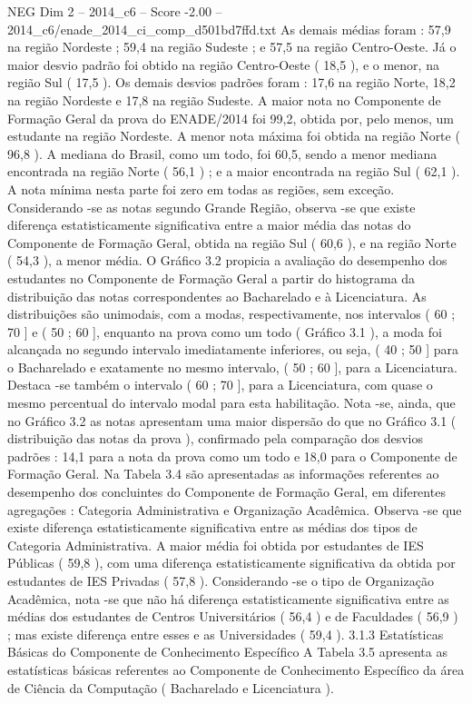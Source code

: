 \begin{textsample}{NEG Dim 2 – 2014\_c6 – Score -2.00 – 2014\_c6/enade\_2014\_ci\_comp\_d501bd7ffd.txt}
As demais médias foram : 57,9 na região Nordeste ; 59,4 na região Sudeste ; e 57,5 na região Centro-Oeste.
Já o maior desvio padrão foi obtido na região Centro-Oeste ( 18,5 ), e o menor, na região Sul ( 17,5 ).
Os demais desvios padrões foram : 17,6 na região Norte, 18,2 na região Nordeste e 17,8 na região Sudeste.
A maior nota no Componente de Formação Geral da prova do ENADE/2014 foi 99,2, obtida por, pelo menos, um estudante na região Nordeste.
A menor nota máxima foi obtida na região Norte ( 96,8 ).
A mediana do Brasil, como um todo, foi 60,5, sendo a menor mediana encontrada na região Norte ( 56,1 ) ; e a maior encontrada na região Sul ( 62,1 ).
A nota mínima nesta parte foi zero em todas as regiões, sem exceção.
Considerando -se as notas segundo Grande Região, observa -se que existe diferença estatisticamente significativa entre a maior média das notas do Componente de Formação Geral, obtida na região Sul ( 60,6 ), e na região Norte ( 54,3 ), a menor média.
O Gráfico 3.2 propicia a avaliação do desempenho dos estudantes no Componente de Formação Geral a partir do histograma da distribuição das notas correspondentes ao Bacharelado e à Licenciatura.
As distribuições são unimodais, com a modas, respectivamente, nos intervalos ( 60 ; 70 ] e ( 50 ; 60 ], enquanto na prova como um todo ( Gráfico 3.1 ), a moda foi alcançada no segundo intervalo imediatamente inferiores, ou seja, ( 40 ; 50 ] para o Bacharelado e exatamente no mesmo intervalo, ( 50 ; 60 ], para a Licenciatura.
Destaca -se também o intervalo ( 60 ; 70 ], para a Licenciatura, com quase o mesmo percentual do intervalo modal para esta habilitação.
Nota -se, ainda, que no Gráfico 3.2 as notas apresentam uma maior dispersão do que no Gráfico 3.1 ( distribuição das notas da prova ), confirmado pela comparação dos desvios padrões : 14,1 para a nota da prova como um todo e 18,0 para o Componente de Formação Geral.
Na Tabela 3.4 são apresentadas as informações referentes ao desempenho dos concluintes do Componente de Formação Geral, em diferentes agregações : Categoria Administrativa e Organização Acadêmica.
Observa -se que existe diferença estatisticamente significativa entre as médias dos tipos de Categoria Administrativa.
A maior média foi obtida por estudantes de IES Públicas ( 59,8 ), com uma diferença estatisticamente significativa da obtida por estudantes de IES Privadas ( 57,8 ).
Considerando -se o tipo de Organização Acadêmica, nota -se que não há diferença estatisticamente significativa entre as médias dos estudantes de Centros Universitários ( 56,4 ) e de Faculdades ( 56,9 ) ; mas existe diferença entre esses e as Universidades ( 59,4 ). 3.1.3 Estatísticas Básicas do Componente de Conhecimento Específico A Tabela 3.5 apresenta as estatísticas básicas referentes ao Componente de Conhecimento Específico da área de Ciência da Computação ( Bacharelado e Licenciatura ).

\end{textsample}
